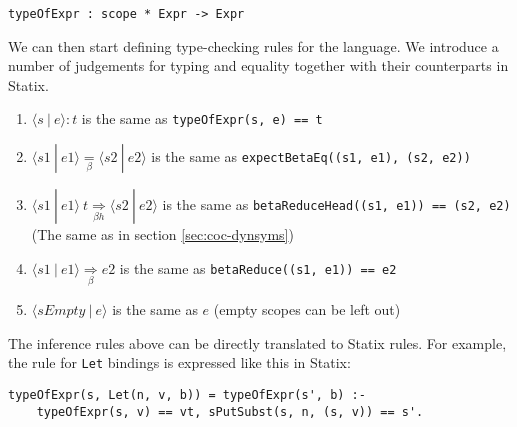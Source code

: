 \documentclass[a4paper,UKenglish,cleveref, autoref, thm-restate]{oasics-v2021}
\newcommand{\scope}[2]{\langle#1 \: | \: #2\rangle}
\newcommand{\bhr}[3]{ #1 \: #2 \underset{\beta h}{\Rightarrow} #3 }
\newcommand{\toe}[3]{ \scope{#1}{#2} : #3 }
\newcommand{\bred}[3]{ \scope{#1}{#2} \underset{\beta}{\Rightarrow} #3 }
\newcommand{\beq}[2]{ #1 \underset{\beta}{=} #2 }
\begin{document}
\begin{lstlisting}
typeOfExpr : scope * Expr -> Expr
\end{lstlisting}
We can then start defining type-checking rules for the language. We introduce a number of judgements for typing and equality together with their counterparts in Statix.
\begin{enumerate}
	\item $\toe{s}{e}{t}$ is the same as \verb|typeOfExpr(s, e) == t|
	\item $\beq{\scope{s1}{e1}}{\scope{s2}{e2}}$ is the same as \verb|expectBetaEq((s1, e1), (s2, e2))|
	\item $\bhr{\scope{s1}{e1}}{t}{\scope{s2}{e2}}$ is the same as \verb|betaReduceHead((s1, e1)) == (s2, e2)| \\ (The same as in section \ref{sec:coc-dynsyms})
	\item $\bred{s1}{e1}{e2}$ is the same as \verb|betaReduce((s1, e1)) == e2|
	\item $\scope{sEmpty}{e}$ is the same as $e$ (empty scopes can be left out)
\end{enumerate}

The inference rules above can be directly translated to Statix rules. For example, the rule for \verb|Let| bindings is expressed like this in Statix:
\begin{lstlisting}
typeOfExpr(s, Let(n, v, b)) = typeOfExpr(s', b) :-
    typeOfExpr(s, v) == vt, sPutSubst(s, n, (s, v)) == s'.
\end{lstlisting}
\end{document}
